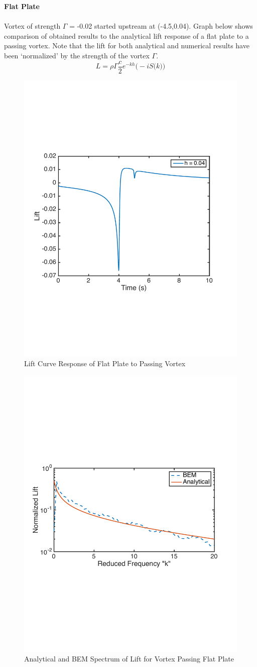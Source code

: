 \documentclass{article}
\begin{document}
\noindent \textbf{Flat Plate} \\ \\
Vortex of strength $\Gamma$ = -0.02 started upstream at (-4.5,0.04). Graph below shows comparison of obtained results to the analytical lift response of a flat plate to a passing vortex. Note that the lift for both analytical and numerical results have been `normalized' by the strength of the vortex $\Gamma$.\\
\begin{equation}
L = \rho \Gamma \frac{c}{2} e^{-kh} \big(-i S\big(k \big) \big)
\end{equation}

\begin{figure}[h]
\includegraphics[width = 4 in, height = 3 in]{Lift_Curve}
\centering
\caption{Lift Curve Response of Flat Plate to Passing Vortex}
\end{figure}

\begin{figure}[h]
\includegraphics[width = 4 in, height = 3 in]{SearsVsBEM}
\centering
\caption{Analytical and BEM Spectrum of Lift for Vortex Passing Flat Plate}
\end{figure}
\newpage

\end{document}
